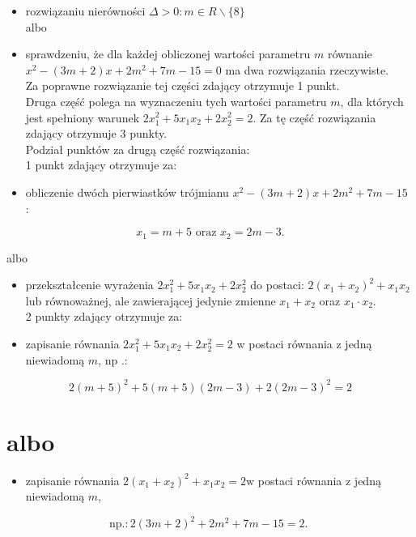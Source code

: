\documentclass[10pt]{article}
\begin{document}
\begin{itemize}
  \item rozwiązaniu nierówności $\Delta>0: m \in R \backslash\{8\}$\\
albo
  \item sprawdzeniu, że dla każdej obliczonej wartości parametru $m$ równanie $x^{2}-(3 m+2) x+2 m^{2}+7 m-15=0$ ma dwa rozwiązania rzeczywiste.\\
Za poprawne rozwiązanie tej części zdający otrzymuje 1 punkt.\\
Druga część polega na wyznaczeniu tych wartości parametru $m$, dla których jest spełniony warunek $2 x_{1}^{2}+5 x_{1} x_{2}+2 x_{2}^{2}=2$. Za tę część rozwiązania zdający otrzymuje 3 punkty.\\
Podział punktów za drugą część rozwiązania:\\
1 punkt zdający otrzymuje za:
  \item obliczenie dwóch pierwiastków trójmianu $x^{2}-(3 m+2) x+2 m^{2}+7 m-15$ :
\end{itemize}

$$
x_{1}=m+5 \text { oraz } x_{2}=2 m-3 .
$$

albo

\begin{itemize}
  \item przekształcenie wyrażenia $2 x_{1}^{2}+5 x_{1} x_{2}+2 x_{2}^{2}$ do postaci: $2\left(x_{1}+x_{2}\right)^{2}+x_{1} x_{2}$\\
lub równoważnej, ale zawierającej jedynie zmienne $x_{1}+x_{2}$ oraz $x_{1} \cdot x_{2}$.\\
2 punkty zdający otrzymuje za:
  \item zapisanie równania $2 x_{1}^{2}+5 x_{1} x_{2}+2 x_{2}^{2}=2$ w postaci równania z jedną niewiadomą $m$, np .:
\end{itemize}

$$
2(m+5)^{2}+5(m+5)(2 m-3)+2(2 m-3)^{2}=2
$$

\section*{albo}
\begin{itemize}
  \item zapisanie równania $2\left(x_{1}+x_{2}\right)^{2}+x_{1} x_{2}=2 \mathrm{w}$ postaci równania z jedną niewiadomą $m$,
\end{itemize}

$$
\mathrm{np} .: 2(3 m+2)^{2}+2 m^{2}+7 m-15=2 \text {. }
$$
\end{document}
